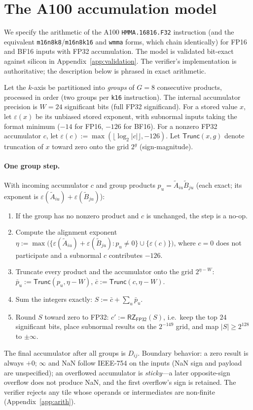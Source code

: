 \documentclass[11pt]{article}
\newcommand{\Trunc}{\textsf{Trunc}}
\newcommand{\RZ}{\textsf{RZ}}
\newcommand{\eps}{\varepsilon}
\newcommand{\At}{\widetilde{A}}
\newcommand{\Bt}{\widetilde{B}}
\newcommand{\FP}[1]{\textsf{FP#1}}
\begin{document}
\section{The A100 accumulation model}\label{sec:device}

We specify the arithmetic of the A100 \texttt{HMMA.16816.F32} instruction (and the
equivalent \texttt{m16n8k8}/\texttt{m16n8k16} and \texttt{wmma} forms, which chain identically)
for \FP{16} and \textsf{BF16} inputs with \FP{32} accumulation. The model is validated bit-exact
against silicon in Appendix~\ref{app:validation}. The verifier's implementation is authoritative;
the description below is phrased in exact arithmetic.

Let the $k$-axis be partitioned into \emph{groups} of $G=8$ consecutive products, processed in
order (two groups per \texttt{k16} instruction). The internal accumulator precision is
$W=24$ significant bits (full \FP{32} significand). For a stored value $x$, let $\eps(x)$ be its
unbiased stored exponent, with subnormal inputs taking the format minimum ($-14$ for \FP{16},
$-126$ for \textsf{BF16}). For a nonzero \FP{32} accumulator $c$, let $\eps(c):=\max(\lfloor\log_2|c|\rfloor,-126)$.
Let $\Trunc(x,g)$ denote truncation of $x$ toward zero onto the grid $2^{g}$ (sign-magnitude).

\paragraph{One group step.} With incoming accumulator $c$ and group products $p_u=\At_{iu}\Bt_{ju}$
(each exact; its exponent is $\eps(\At_{iu})+\eps(\Bt_{ju})$):
\begin{enumerate}[nosep]
\item If the group has no nonzero product and $c$ is unchanged, the step is a no-op.
\item Compute the alignment exponent
      $\eta := \max\big(\{\eps(\At_{iu})+\eps(\Bt_{ju}) : p_u\neq0\}\cup\{\eps(c)\}\big)$,
      where $c=0$ does not participate and a subnormal $c$ contributes $-126$.
\item Truncate every product and the accumulator onto the grid $2^{\eta-W}$:
      $\bar p_u := \Trunc(p_u,\eta-W)$, $\bar c := \Trunc(c,\eta-W)$.
\item Sum the integers exactly: $S := \bar c + \sum_u \bar p_u$.
\item Round $S$ toward zero to \FP{32}: $c' := \RZ_{\FP{32}}(S)$, i.e.\ keep the top $24$
      significant bits, place subnormal results on the $2^{-149}$ grid, and map $|S|\ge 2^{128}$
      to $\pm\infty$.
\end{enumerate}
The final accumulator after all groups is $D_{ij}$. Boundary behavior: a zero result is always
$+0$; $\infty$ and NaN follow IEEE-754 on the inputs (NaN sign and payload are unspecified); an
overflowed accumulator is \emph{sticky}---a later opposite-sign overflow does not produce NaN,
and the first overflow's sign is retained. The verifier rejects any tile whose operands or
intermediates are non-finite (Appendix~\ref{app:arith}).
\end{document}
